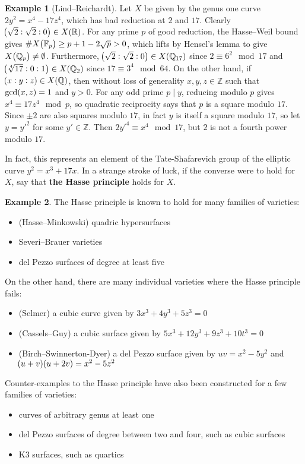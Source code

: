 \documentclass{article}
\theoremstyle{plain}
\theoremstyle{definition}
\newtheorem*{example}{Example}
\newcommand{\FF}{\mathbb{F}}
\newcommand{\QQ}{\mathbb{Q}}
\newcommand{\RR}{\mathbb{R}}
\newcommand{\ZZ}{\mathbb{Z}}
\newcommand{\br}{\!\del}
\begin{document}
\begin{example}[Lind--Reichardt]
Let $ X $ be given by the genus one curve $ 2y^2 = x^4 - 17z^4 $, which has bad reduction at $ 2 $ and $ 17 $. Clearly $ \br[1]{\sqrt{2} : \sqrt{2} : 0} \in X\br{\RR} $. For any prime $ p $ of good reduction, the Hasse--Weil bound gives $ \#X\br{\FF_p} \ge p + 1 - 2\sqrt{p} > 0 $, which lifts by Hensel's lemma to give $ X\br{\QQ_p} \ne \emptyset $. Furthermore, $ \br[1]{\sqrt{2} : \sqrt{2} : 0} \in X\br{\QQ_{17}} $ since $ 2 \equiv 6^2 \mod 17 $ and $ \br[1]{\sqrt[4]{17} : 0 : 1} \in X\br{\QQ_2} $ since $ 17 \equiv 3^4 \mod 64 $. On the other hand, if $ \br{x : y : z} \in X\br{\QQ} $, then without loss of generality $ x, y, z \in \ZZ $ such that $ \gcd\br{x, z} = 1 $ and $ y > 0 $. For any odd prime $ p \mid y $, reducing modulo $ p $ gives $ x^4 \equiv 17z^4 \mod p $, so quadratic reciprocity says that $ p $ is a square modulo $ 17 $. Since $ \pm2 $ are also squares modulo $ 17 $, in fact $ y $ is itself a square modulo $ 17 $, so let $ y = y'^2 $ for some $ y' \in \ZZ $. Then $ 2y'^4 \equiv x^4 \mod 17 $, but $ 2 $ is not a fourth power modulo $ 17 $.
\end{example}

In fact, this represents an element of the Tate-Shafarevich group of the elliptic curve $ y^2 = x^3 + 17x $. In a strange stroke of luck, if the converse were to hold for $ X $, say that \textbf{the Hasse principle} holds for $ X $.

\begin{example}
The Hasse principle is known to hold for many families of varieties:
\begin{itemize}
\item (Hasse--Minkowski) quadric hypersurfaces
\item Severi--Brauer varieties
\item del Pezzo surfaces of degree at least five
\end{itemize}
On the other hand, there are many individual varieties where the Hasse principle fails:
\begin{itemize}
\item (Selmer) a cubic curve given by $ 3x^3 + 4y^3 + 5z^3 = 0 $
\item (Cassels--Guy) a cubic surface given by $ 5x^3 + 12y^3 + 9z^3 + 10t^3 = 0 $
\item (Birch--Swinnerton-Dyer) a del Pezzo surface given by $ uv = x^2 - 5y^2 $ and $ \br{u + v}\br{u + 2v} = x^2 - 5z^2 $
\end{itemize}
Counter-examples to the Hasse principle have also been constructed for a few families of varieties:
\begin{itemize}
\item curves of arbitrary genus at least one
\item del Pezzo surfaces of degree between two and four, such as cubic surfaces
\item K3 surfaces, such as quartics
\end{itemize}
\end{example}
\end{document}

